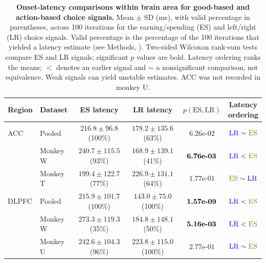 \documentclass[pdflatex,sn-mathphys-num]{sn-jnl}%
\newcommand{\ESc}{\textcolor{choiceES}{\mathrm{ES}}}
\newcommand{\LRc}{\textcolor{choiceLR}{\mathrm{LR}}}
\begin{document}
\clearpage
\begin{table}[p]\centering
\caption{\textbf{Onset-latency comparisons within brain area for good-based and action-based choice signals.} Mean $\pm$ SD (ms), with valid percentage in parentheses, across 100 iterations for the earning/spending (ES) and left/right (LR) choice signals. Valid percentage is the percentage of the 100 iterations that yielded a latency estimate (see Methods, ). Two-sided Wilcoxon rank-sum tests compare ES and LR signals; significant $p$ values are bold. Latency ordering ranks the means; $<$ denotes an earlier signal and $\sim$ a nonsignificant comparison, not equivalence. Weak signals can yield unstable estimates. ACC was not recorded in monkey U.}
\label{tab:supp_choice_onset}
\begingroup\fontsize{6.5}{8}\selectfont\setlength{\tabcolsep}{1pt}
\begin{tabular*}{\textwidth}{@{\extracolsep{\fill}}llcccc@{}}\toprule
Region & Dataset & ES latency & LR latency & $p(\mathrm{ES},\mathrm{LR})$ & \shortstack{Latency\\ordering}\\\midrule
ACC & Pooled & \shortstack[c]{$216.8\pm96.8$\\(100\%)} & \shortstack[c]{$178.2\pm135.6$\\(63\%)} & $\mbox{6.26e-02}$ & $\LRc \sim \ESc$ \\
  & Monkey W & \shortstack[c]{$240.7\pm115.5$\\(93\%)} & \shortstack[c]{$168.9\pm139.1$\\(41\%)} & $\text{\bfseries \mbox{6.76e-03}}$ & $\LRc < \ESc$ \\
  & Monkey T & \shortstack[c]{$199.4\pm122.7$\\(77\%)} & \shortstack[c]{$226.9\pm131.1$\\(64\%)} & $\mbox{1.77e-01}$ & $\ESc \sim \LRc$ \\
\midrule
DLPFC & Pooled & \shortstack[c]{$215.9\pm101.7$\\(100\%)} & \shortstack[c]{$143.0\pm75.0$\\(100\%)} & $\text{\bfseries \mbox{1.57e-09}}$ & $\LRc < \ESc$ \\
  & Monkey W & \shortstack[c]{$273.3\pm119.3$\\(35\%)} & \shortstack[c]{$184.8\pm148.1$\\(50\%)} & $\text{\bfseries \mbox{5.16e-03}}$ & $\LRc < \ESc$ \\
  & Monkey U & \shortstack[c]{$242.6\pm104.3$\\(96\%)} & \shortstack[c]{$223.8\pm115.0$\\(100\%)} & $\mbox{2.77e-01}$ & $\LRc \sim \ESc$ \\

\end{tabular*}
\end{table}
\end{document}
